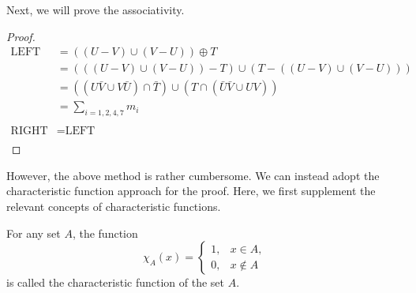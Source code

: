 \documentclass[../main.tex]{subfiles}
\begin{document}
Next, we will prove the associativity.

\begin{proof}

    \begin{align*}
    \text{LEFT} 
    &= ((U - V) \cup (V - U)) \oplus T\\
    &= (((U - V) \cup (V - U)) - T) \cup (T - ((U - V) \cup (V - U)))\\
    &= ((U\bar V \cup V\bar U)\cap \bar T) \cup (T\cap (\bar U\bar V \cup UV))\\
    &= \sum_{i=1,2,4,7}m_i\\
    \\
    \text{RIGHT}
    &=\text{LEFT}\\
\end{align*}

\end{proof}

However, the above method is rather cumbersome. We can instead adopt the characteristic function approach for the proof. Here, we first supplement the relevant concepts of characteristic functions.

\begin{purple}
\begin{definition}
For any set $A$, the function
$$
\chi_A(x)=\begin{cases}
1, & x\in A,\\
0, & x\notin A
\end{cases}
$$
is called the characteristic function of the set $A$. 

\end{definition}
\end{purple}
\end{document}
